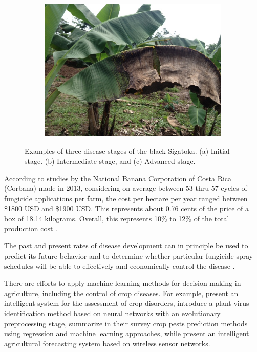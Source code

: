 \documentclass[review]{elsarticle}
\begin{document}
\begin{figure}[h]
\begin{subfigure}{.3\textwidth}
  \caption{}
  \label{fig:sfig2}
\end{subfigure}
\begin{subfigure}{.3\textwidth}
  \centering
  \includegraphics[width=.8\linewidth]{Roya_c}
  \caption{}
  \label{fig:sfig3}
\end{subfigure}
\caption{Examples of three disease stages of the black Sigatoka. (a) Initial stage. (b) Intermediate stage, and (c) Advanced stage.} 
\label{figura1} 
\end{figure}

According to studies by the National Banana Corporation of Costa Rica
(Corbana) made in 2013, considering on average between 53 thru 57
cycles of fungicide applications per farm, the cost per hectare per
year ranged between \$1800 USD and \$1900 USD. This represents
about 0.76 cents of the price of a box of 18.14 kilograms. Overall,
this represents 10\% to 12\% of the total production cost
\citet{Bresciani2015}.

The past and present rates of disease development  can in principle be used
to predict its future behavior and to determine whether
particular fungicide spray schedules will be able to effectively and
economically control the disease \citet{ChuangJeger1987}.

There are efforts to apply machine learning methods for
decision-making in agriculture, including the control of crop
diseases. For example, \cite{Camargo2012} present an intelligent
system for the assessment of crop disorders, \cite{Huang2010}
introduce a plant virus identification method based on neural networks with an evolutionary preprocessing stage, \cite{Kim2014} summarize in
their survey crop pests prediction methods using regression and
machine learning approaches, while \cite{Zhao2013} present an
intelligent agricultural forecasting system based on wireless sensor
networks.
\end{document}
